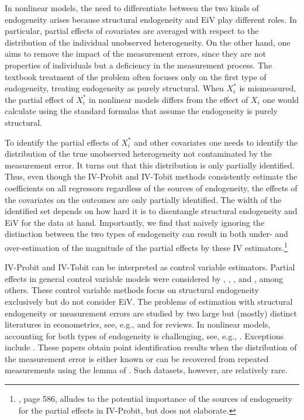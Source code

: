 \documentclass[12pt]{article}
\begin{document}
In nonlinear models, the need to differentiate between the two kinds of
endogeneity arises because structural endogeneity and EiV play different
roles. In particular, partial effects of covariates are averaged with
respect to the distribution of the individual unobserved heterogeneity. On
the other hand, one aims to remove the impact of the measurement errors,
since they are not properties of individuals but a deficiency in the
measurement process. The textbook treatment of the problem often focuses
only on the first type of endogeneity, treating endogeneity as purely
structural. When $X_{i}^{\ast }$ is mismeasured, the partial effect of $%
X_{i}^{\ast }$ in nonlinear models differs from the effect of $X_{i}$ one
would calculate using the standard formulas that assume the endogeneity is
purely structural.{}

To identify the partial effects of $X_{i}^{\ast }$ and other covariates one
needs to identify the distribution of the true unobserved heterogeneity not
contaminated by the measurement error. It turns out that this distribution
is only partially identified. Thus, even though the IV-Probit and IV-Tobit
methods consistently estimate the coefficients on all regressors regardless
of the sources of endogeneity, the effects of the covariates on the outcomes
are only partially identified. The width of the identified set depends on
how hard it is to disentangle structural endogeneity and EiV for the data at
hand. Importantly, we find that naively ignoring the distinction between the
two types of endogeneity can result in both under- and over-estimation of
the magnitude of the partial effects by these IV estimators.\footnote{\cite%
{Wooldridge2010Book}, page 586, alludes to the potential importance of the
sources of endogeneity for the partial effects in IV-Probit, but does not
elaborate.}

IV-Probit and IV-Tobit can be interpreted as control variable estimators.
Partial effects in general control variable models were considered by \cite%
{BlundellPowell2003Advances}, \cite{Chesher2003Ecta}, \cite%
{ImbensNewey2009Ecta}, and \cite{Wooldridge2005APE,Wooldridge2015JHR}, among
others. These control variable methods focus on structural endogeneity
exclusively but do not consider EiV. The problems of estimation with
structural endogeneity or measurement errors are studied by two large but
(mostly) distinct literatures in econometrics, see, e.g., \cite%
{Matzkin2013AnnRev} and \cite{Schennach2020HB-ME} for reviews. In nonlinear
models, accounting for both types of endogeneity is challenging, see, e.g., 
\cite{Schennach2022JEcLit}. Exceptions include \cite%
{AdusumilliOtsu2018ET,SongSchennachWhite2015QE,SchennachWhiteChalak2012JoE,HahnRidder2017JoE}%
. These papers obtain point identification results when the distribution of
the measurement error is either known or can be recovered from repeated
measurements using the lemma of \cite{Kotlarski1967}. Such datasets,
however, are relatively rare.
\end{document}
